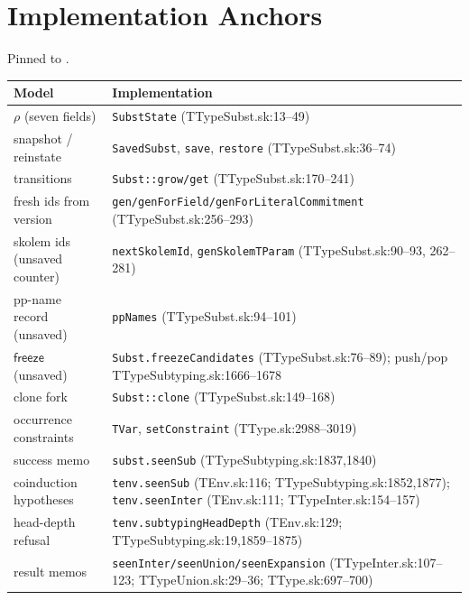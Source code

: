 \documentclass[11pt]{article}
\begin{document}


\appendix
\section{Implementation Anchors}

Pinned to \texttt{\skjspinhash}.

\begin{center}
\renewcommand{\arraystretch}{1.25}
\small
\begin{tabular}{@{}>{\raggedright\arraybackslash}p{4.8cm}@{\quad}>{\raggedright\arraybackslash}p{9.8cm}@{}}
\toprule
\textbf{Model} & \textbf{Implementation} \\
\midrule
$\rho$ (seven fields) & \texttt{SubstState} (TTypeSubst.sk:13--49) \\
snapshot / reinstate & \texttt{SavedSubst}, \texttt{save},
  \texttt{restore} (TTypeSubst.sk:36--74) \\
transitions & \texttt{Subst::grow/get} (TTypeSubst.sk:170--241) \\
fresh ids from version & \texttt{gen/genForField/genForLiteralCommitment}
  (TTypeSubst.sk:256--293) \\
skolem ids (unsaved counter) & \texttt{nextSkolemId},
  \texttt{genSkolemTParam} (TTypeSubst.sk:90--93, 262--281) \\
pp-name record (unsaved) & \texttt{ppNames} (TTypeSubst.sk:94--101) \\
$\mathsf{freeze}$ (unsaved) & \texttt{Subst.freezeCandidates}
  (TTypeSubst.sk:76--89); push/pop TTypeSubtyping.sk:1666--1678 \\
clone fork & \texttt{Subst::clone} (TTypeSubst.sk:149--168) \\
occurrence constraints & \texttt{TVar}, \texttt{setConstraint}
  (TType.sk:2988--3019) \\
success memo & \texttt{subst.seenSub}
  (TTypeSubtyping.sk:1837,1840) \\
coinduction hypotheses & \texttt{tenv.seenSub} (TEnv.sk:116;
  TTypeSubtyping.sk:1852,1877); \texttt{tenv.seenInter}
  (TEnv.sk:111; TTypeInter.sk:154--157) \\
head-depth refusal & \texttt{tenv.subtypingHeadDepth} (TEnv.sk:129;
  TTypeSubtyping.sk:19,1859--1875) \\
result memos & \texttt{seenInter/seenUnion/seenExpansion}
  (TTypeInter.sk:107--123; TTypeUnion.sk:29--36; TType.sk:697--700) \\

\end{tabular}
\end{center}
\end{document}
